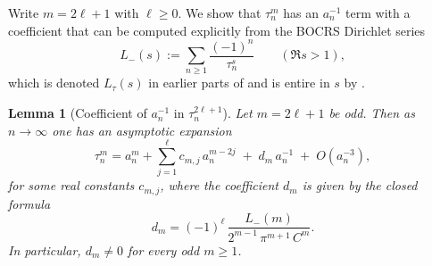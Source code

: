 \documentclass[11pt,letterpaper]{amsart}
\numberwithin{equation}{section}
\newtheorem{lemma}[theorem]{Lemma}
\theoremstyle{definition}
\begin{document}
Write $m=2\ell+1$ with $\ell\ge0$.
We show that $\tau_n^m$ has an $a_n^{-1}$ term with a coefficient that can be computed explicitly
from the BOCRS Dirichlet series
\[
L_-(s):=\sum_{n\ge1}\frac{(-1)^n}{\tau_n^s}\qquad (\Re s>1),
\]
which is denoted $L_\tau(s)$ in earlier parts of \cite{BOCRS} and is entire in $s$ by \cite[\S10.2]{BOCRS}.

\begin{lemma}[Coefficient of $a_n^{-1}$ in $\tau_n^{2\ell+1}$]\label{lem:a-1-coeff}
Let $m=2\ell+1$ be odd. Then as $n\to\infty$ one has an asymptotic expansion
\begin{equation}\label{eq:tau-m-expansion}
\tau_n^m
= a_n^m+\sum_{j=1}^{\ell} c_{m,j}\,a_n^{m-2j}\;+\; d_m\,a_n^{-1}\;+\;O(a_n^{-3}),
\end{equation}
for some real constants $c_{m,j}$, where the coefficient $d_m$ is given by the closed formula
\begin{equation}\label{eq:d_m-formula}
d_m
=(-1)^{\ell}\,\frac{L_-(m)}{2^{m-1}\,\pi^{m+1}\,C^{m}}.
\end{equation}
In particular, $d_m\neq0$ for every odd $m\ge1$.
\end{lemma}
\end{document}
